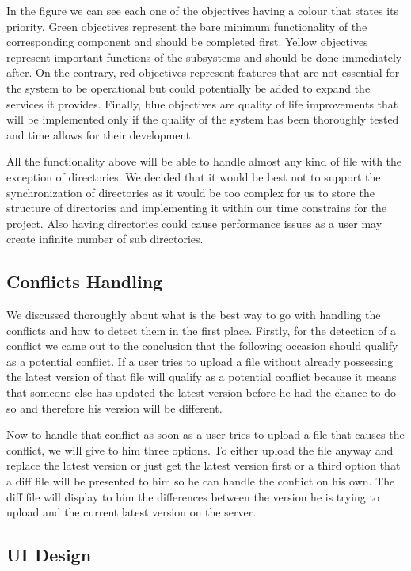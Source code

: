 \documentclass[11pt]{article}
\begin{document}
In the figure we can see each one of the objectives having a colour that states its priority. Green objectives represent the bare minimum functionality of the corresponding component and should be completed first. Yellow objectives represent important functions of the subsystems and should be done immediately after. On the contrary, red objectives represent features that are not essential for the system to be operational but could potentially be added to expand the services it provides. Finally, blue objectives are quality of life improvements that will be implemented only if the quality of the system has been thoroughly tested and time allows for their development.

All the functionality above will be able to handle almost any kind of file with the exception of directories. We decided that it would be best not to support the synchronization of directories as it would be too complex for us to store the structure of directories and implementing it within our time constrains for the project. Also having directories could cause performance issues as a user may create infinite number of sub directories.

\subsection{Conflicts Handling}

We discussed thoroughly about what is the best way to go with handling the conflicts and how to detect them in the first place. Firstly, for the detection of a conflict we came out to the conclusion that the following occasion should qualify as a potential conflict. If a user tries to upload a file without already possessing the latest version of that file will qualify as a potential conflict because it means that someone else has updated the latest version before he had the chance to do so and therefore his version will be different.

Now to handle that conflict as soon as a user tries to upload a file that causes the conflict, we will give to him three options. To either upload the file anyway and replace the latest version or just get the latest version first or a third option that a diff file will be presented to him so he can handle the conflict on his own. The diff file will display to him the differences between the version he is trying to upload and the current latest version on the server.

\subsection{UI Design}
\end{document}
